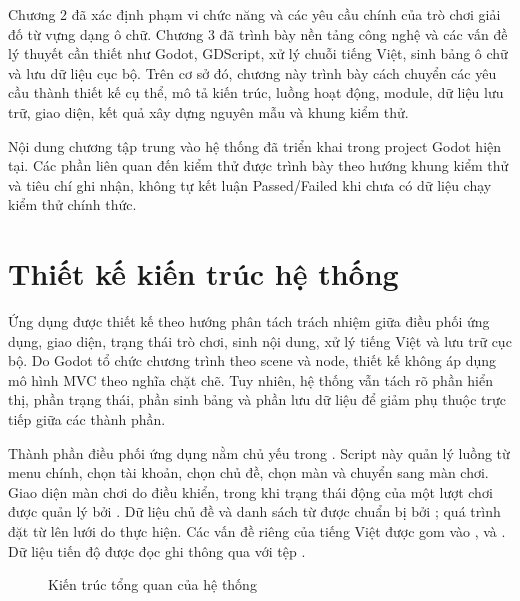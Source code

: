 \documentclass[../DoAn.tex]{subfiles}
\begin{document}
Chương 2 đã xác định phạm vi chức năng và các yêu cầu chính của trò chơi giải đố từ vựng dạng ô chữ. Chương 3 đã trình bày nền tảng công nghệ và các vấn đề lý thuyết cần thiết như Godot, GDScript, xử lý chuỗi tiếng Việt, sinh bảng ô chữ và lưu dữ liệu cục bộ. Trên cơ sở đó, chương này trình bày cách chuyển các yêu cầu thành thiết kế cụ thể, mô tả kiến trúc, luồng hoạt động, module, dữ liệu lưu trữ, giao diện, kết quả xây dựng nguyên mẫu và khung kiểm thử.

Nội dung chương tập trung vào hệ thống đã triển khai trong project Godot hiện tại. Các phần liên quan đến kiểm thử được trình bày theo hướng khung kiểm thử và tiêu chí ghi nhận, không tự kết luận Passed/Failed khi chưa có dữ liệu chạy kiểm thử chính thức.

\section{Thiết kế kiến trúc hệ thống}
\label{section:4.1}

Ứng dụng được thiết kế theo hướng phân tách trách nhiệm giữa điều phối ứng dụng, giao diện, trạng thái trò chơi, sinh nội dung, xử lý tiếng Việt và lưu trữ cục bộ. Do Godot tổ chức chương trình theo scene và node, thiết kế không áp dụng mô hình MVC theo nghĩa chặt chẽ. Tuy nhiên, hệ thống vẫn tách rõ phần hiển thị, phần trạng thái, phần sinh bảng và phần lưu dữ liệu để giảm phụ thuộc trực tiếp giữa các thành phần.

Thành phần điều phối ứng dụng nằm chủ yếu trong . Script này quản lý luồng từ menu chính, chọn tài khoản, chọn chủ đề, chọn màn và chuyển sang màn chơi. Giao diện màn chơi do  điều khiển, trong khi trạng thái động của một lượt chơi được quản lý bởi . Dữ liệu chủ đề và danh sách từ được chuẩn bị bởi ; quá trình đặt từ lên lưới do  thực hiện. Các vấn đề riêng của tiếng Việt được gom vào ,  và . Dữ liệu tiến độ được đọc ghi thông qua  với tệp .

\begin{figure}[H]
\centering
\resizebox{0.95\textwidth}{!}{}
\caption{Kiến trúc tổng quan của hệ thống}
\label{fig:kien-truc-he-thong}
\end{figure}
\end{document}
